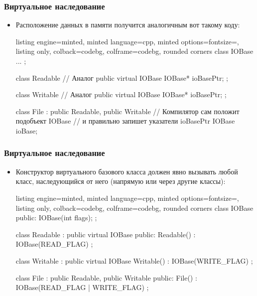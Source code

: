 \documentclass[10pt]{beamer}
\begin{document}
\begin{frame}[fragile]
\frametitle{Виртуальное наследование}
\begin{itemize}
\item Расположение данных в памяти получится аналогичным вот такому коду:
\begin{tcblisting}{listing engine=minted, minted language=cpp, minted options={fontsize=\scriptsize}, listing only, colback=codebg, colframe=codebg, rounded corners}
class IOBase { ... };

class Readable {
  // Аналог public virtual IOBase
  IOBase* ioBasePtr;
};

class Writable {
  // Аналог public virtual IOBase
  IOBase* ioBasePtr;
};

class File : public Readable, public Writable {
  // Компилятор сам положит подобъект IOBase
  // и правильно запишет указатели ioBasePtr
  IOBase ioBase;
}
\end{tcblisting}
\end{itemize}
\end{frame}

\begin{frame}[fragile]
\frametitle{Виртуальное наследование}
\begin{itemize}
\item Конструктор виртуального базового класса должен явно вызывать любой класс, наследующийся от него (напрямую или через другие классы):
\begin{tcblisting}{listing engine=minted, minted language=cpp, minted options={fontsize=\scriptsize}, listing only, colback=codebg, colframe=codebg, rounded corners}
class IOBase {
public:
  IOBase(int flags);
};

class Readable : public virtual IOBase {
public:
  Readable() : IOBase(READ_FLAG) {}
};

class Writable : public virtual IOBase {
  Writable() : IOBase(WRITE_FLAG) {}
};

class File : public Readable, public Writable {
public:
  File() : IOBase(READ_FLAG | WRITE_FLAG) {}
};
\end{tcblisting}
\end{itemize}
\end{frame}
\end{document}
